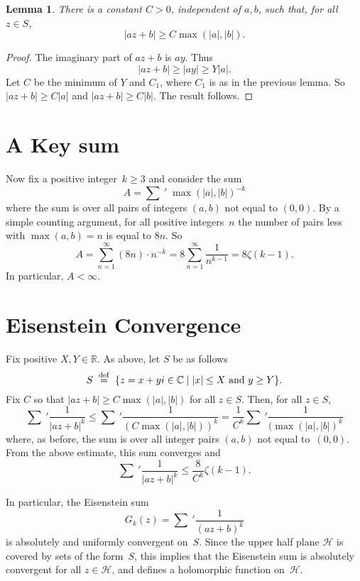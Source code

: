 \documentclass {amsart}
\theoremstyle{plain}
\newtheorem{lemma}[proposition]{Lemma}
\theoremstyle{definition}
\theoremstyle{remark}
\newcommand{\defeq}{\stackrel{\mathrm{def}}{\, = \,}}
\newcommand{\bR}{{\mathbb{R}}}
\newcommand{\bC}{{\mathbb{C}}}
\newcommand{\h}{{\mathcal{H}}}
\begin{document}
\begin{lemma}
There is a constant $C > 0$, independent of $a, b$, such that, for all $z\in S$,
$$
|a z + b| \ge C \max( |a|,  |b|).
$$
\end{lemma}

\begin{proof}
The imaginary part of $a z + b$ is $a y$. Thus
$$
|a z + b| \ge |a y|  \ge Y |a|.
$$
Let $C$ be the minimum of $Y$ and $C_1$, where $C_1$ is as in the previous lemma.
So $|a z + b| \ge C |a|$ and $|a z + b| \ge C |b|$. The result follows.
\end{proof}



\section {A Key sum}

Now fix a positive integer~$k \ge 3$ and consider the sum
$$
A = \sum \ \!\! '  \; \max(|a|, |b|)^{-k}
$$
where the sum is over all pairs of integers $(a, b)$ not equal to $(0, 0)$.
By a simple counting argument,  for all positive integers~$n$ the number of pairs less 
with $\max (a, b) = n$ is equal to $8 n$.
So
$$
A =  \sum_{n=1}^\infty (8 n) \cdot n^{-k} =
8  \sum_{n=1}^\infty \frac{1}{n^{k-1}} =  8 \zeta (k-1).
$$
In particular, $A < \infty$.



\section {Eisenstein Convergence}

Fix positive $X, Y \in \bR$. As above, let $S$ be as follows
$$S \; \defeq \; \{ z = x + y i \in \bC \mid \hbox{$|x| \le X$  and $y \ge Y$} \}.$$
Fix $C$ so that $|a z + b| \ge C \max(|a|, |b|)$
for all $z \in S$. 
Then, for all $z \in S$,
$$
 \sum \ \!\! '  \frac{1}{|a z + b|^k} \le  \sum \ \!\! ' \frac{1}{(C \max(|a|, |b|))^k}
= \frac{1}{C^k}   \sum \ \!\! ' \frac{1}{(\max(|a|, |b|)^k}
$$
where, as before,  the sum is over all integer pairs $(a, b)$ not equal to~$(0,0)$.
From the above estimate, this sum converges and
$$
 \sum \ \!\! '  \frac{1}{|a z + b|^k} \le \frac{8}{C^k} \zeta (k - 1).
$$

In particular, the Eisenstein sum
$$
G_k (z) =  \sum \ \!\! '  \frac{1}{(a z + b)^k}
$$
is absolutely and uniformly convergent on~$S$. Since 
the upper half plane $\h$ is covered by sets of the form~$S$, this implies that the Eisenstein sum is absolutely convergent for all $z\in \h$, and defines a holomorphic function on~$\h$.
\end{document}
